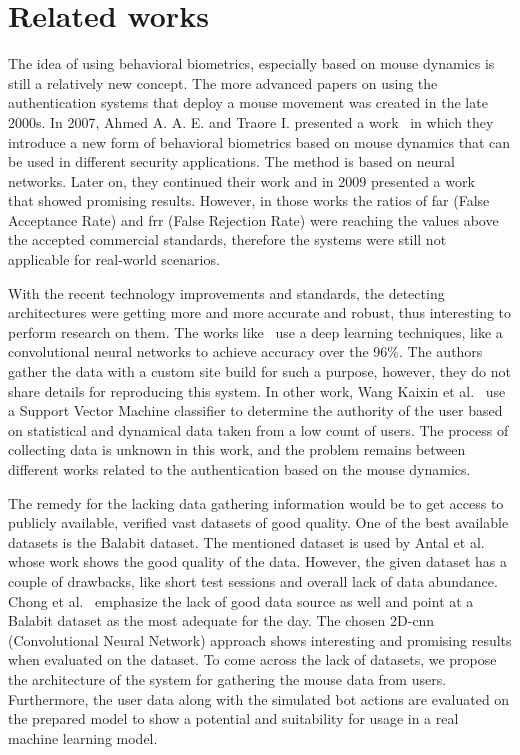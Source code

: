 \section{Related works}\label{sec:related-works}
The idea of using behavioral biometrics, especially based on mouse dynamics is still a relatively new concept.
The more advanced papers on using the authentication systems that deploy a mouse movement was created in the late 2000s.
In 2007, Ahmed A. A. E. and Traore I. presented a work~\cite{firstMouseBBPapers1} in which they introduce a new form of behavioral biometrics based on mouse dynamics that can be used in different security applications.
The method is based on neural networks.
Later on, they continued their work and in 2009 presented a work~\cite{wang2009behavioral} that showed promising results.
However, in those works the ratios of \gls{far} (False Acceptance Rate) and \gls{frr} (False Rejection Rate) were reaching the values above the accepted commercial standards, therefore the systems were still not applicable for real-world scenarios.

With the recent technology improvements and standards, the detecting architectures were getting more and more accurate and robust, thus interesting to perform research on them.
The works like~\cite{a-deep-learning-approach-to-web-bot-detection-using-mouse-behavioral-biometrics} use a deep learning techniques, like a convolutional neural networks to achieve accuracy over the 96\%.
The authors gather the data with a custom site build for such a purpose, however, they do not share details for reproducing this system.
In other work, Wang Kaixin et al.~\cite{a-user-authentication-and-identification-model-based-on-mouse-dynamics} use a Support Vector Machine classifier to determine the authority of the user based on statistical and dynamical data taken from a low count of users.
The process of collecting data is unknown in this work, and the problem remains between different works related to the authentication based on the mouse dynamics.

The remedy for the lacking data gathering information would be to get access to publicly available, verified vast datasets of good quality.
One of the best available datasets is the Balabit dataset.
The mentioned dataset is used by Antal et al.~\cite{antal2019intrusion} whose work shows the good quality of the data.
However, the given dataset has a couple of drawbacks, like short test sessions and overall lack of data abundance.
Chong et al.~\cite{Main} emphasize the lack of good data source as well and point at a Balabit dataset as the most adequate for the day.
The chosen 2D-\gls{cnn} (Convolutional Neural Network) approach shows interesting and promising results when evaluated on the dataset.
To come across the lack of datasets, we propose the architecture of the system for gathering the mouse data from users.
Furthermore, the user data along with the simulated bot actions are evaluated on the prepared model to show a potential and suitability for usage in a real machine learning model.
